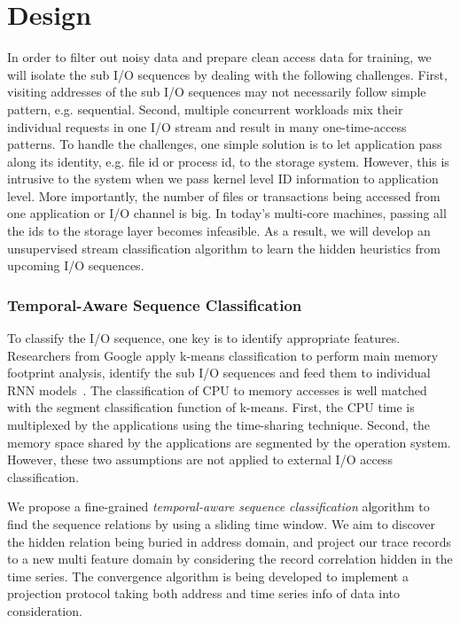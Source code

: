 \section{Design}


In order to filter out noisy data and prepare clean access data for training, we will isolate the sub I/O sequences by dealing with the following challenges. First, visiting addresses of the sub I/O sequences may not necessarily follow simple pattern, e.g. sequential. Second, multiple concurrent workloads mix their individual requests in one I/O stream and result in many one-time-access patterns. To handle the challenges, one simple solution is to let application pass along its identity, e.g. file id or process id, to the storage system. However, this is intrusive to the system when we pass kernel level ID information to application level. More importantly, the number of files or transactions being accessed from one application or I/O channel is big. In today's multi-core machines, passing all the ids to the storage layer becomes infeasible. As a result, we will develop an unsupervised stream classification algorithm to learn the hidden heuristics from upcoming I/O sequences.

\subsubsection*{Temporal-Aware Sequence Classification}

To classify the I/O sequence,
one key is to identify appropriate features.
Researchers from Google apply k-means classification to perform main memory
footprint analysis, identify the sub I/O sequences and feed them
to individual RNN models~\cite{hashemi2018learning}.
The classification of CPU to memory accesses is well matched with
the segment classification function of k-means.
First, the CPU time is multiplexed by the applications using the time-sharing technique.
Second, the memory space shared by the applications are segmented
by the operation system.
However, these two assumptions are not applied to external I/O access classification.

\iffalse
We propose a fine-grained \emph{temporal-aware sequence classification} algorithm
to find the sequence relations by using a sliding time window.
We aim to discover the hidden relation being buried in address domain,
and project our trace records to a new multi feature domain
by considering the record correlation hidden in the time series.
The convergence algorithm is being developed to implement a projection protocol
taking both address and time series info of data into consideration.

